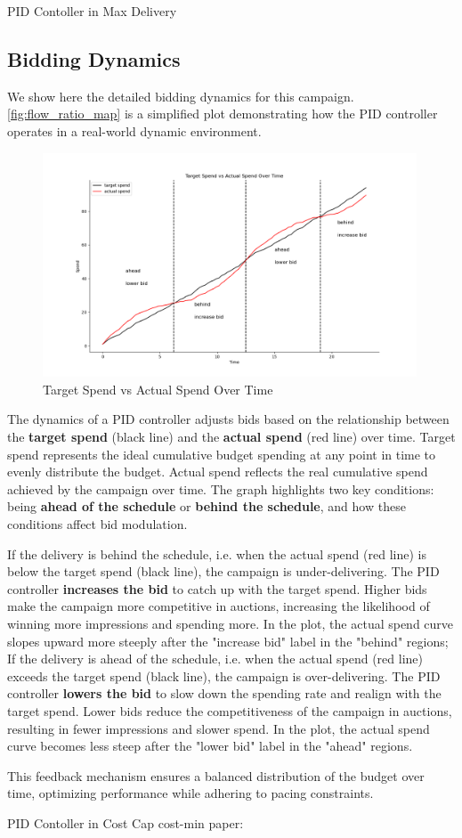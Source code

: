 \documentclass[../main.tex]{subfiles}
\begin{document}
\begin{section}{PID Contoller in Max Delivery}
		\subsection*{Bidding Dynamics}
		We show here the detailed bidding dynamics for this campaign. \autoref{fig:flow_ratio_map} is a simplified plot demonstrating how the PID controller operates in a real-world dynamic environment. 
		\begin{figure}[H]
			\centering
			\includegraphics[width=0.99\textwidth]{../Images/flow_ratio_map.png}
			\caption{Target Spend vs Actual Spend Over Time}
			\label{fig:flow_ratio_map}
		\end{figure}
	The dynamics of a PID controller adjusts bids based on the relationship between the \textbf{target spend} (black line) and the \textbf{actual spend} (red line) over time. Target spend represents the ideal cumulative budget spending at any point in time to evenly distribute the budget. Actual spend reflects the real cumulative spend achieved by the campaign over time.  The graph highlights two key conditions: being \textbf{ahead of the schedule} or \textbf{behind the schedule}, and how these conditions affect bid modulation.
	
	If the delivery is behind the schedule, i.e. when the actual spend (red line) is below the target spend (black line), the campaign is under-delivering. The PID controller \textbf{increases the bid} to catch up with the target spend. Higher bids make the campaign more competitive in auctions, increasing the likelihood of winning more impressions and spending more. In the plot, the actual spend curve slopes upward more steeply after the "increase bid" label in the "behind" regions; If the delivery is ahead of the schedule, i.e. when the actual spend (red line) exceeds the target spend (black line), the campaign is over-delivering. The PID controller \textbf{lowers the bid} to slow down the spending rate and realign with the target spend. Lower bids reduce the competitiveness of the campaign in auctions, resulting in fewer impressions and slower spend. In the plot, the actual spend curve becomes less steep after the "lower bid" label in the "ahead" regions.
	
	This feedback mechanism ensures a balanced distribution of the budget over time, optimizing performance while adhering to pacing constraints.
	
	\end{section}
	
	
	\begin{section}{PID Contoller in Cost Cap}
		cost-min paper: \cite{kitts2017ad}
		
	\end{section}
	
	
\end{document}
